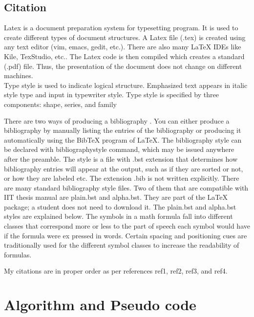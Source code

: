 \documentclass[titlepage]{article}
\begin{document}
\subsection{Citation}
Latex  \cite{ref1} is a document preparation system for typesetting program. It is used to create different types of document structures. A Latex file (.tex) is created using any text editor (vim, emacs, gedit, etc.). There are also many LaTeX IDEs like Kile, TexStudio, etc.. The Latex code is then compiled which creates a standard (.pdf) file. Thus, the presentation of the document does not change on different machines.\\
Type style \cite{ref2} is used to indicate logical structure. Emphasized text appears in italic style type and input in typewriter style. Type style is specified by three components: shape, series, and family\par
There are two ways of producing a bibliography \cite{ref3}. You can either produce a bibliography by manually listing the entries of the bibliography or producing it automatically using the BibTeX program of LaTeX. The bibliography style can be declared with bibliographystyle command, which may be issued anywhere after the preamble. The style is a file with .bst extension that determines how  bibliography entries will appear at the output, such as if they are sorted or not, or how they are labeled etc. The extension .bib is not written explicitly. There are many standard bibliography style files. Two of them that are compatible with IIT thesis manual are plain.bst and alpha.bst. They are part of the LaTeX package; a student does not need to download it. The plain.bst and alpha.bst styles are explained below. The symbols in a math formula fall into different classes that correspond more or less to the part of speech each symbol would have if the formula were ex pressed in words. Certain spacing and positioning cues are traditionally used for the different symbol classes to increase the readability of formulas. \cite{ref4}\par
My citations are in proper order as per references ref1, ref2, ref3, and ref4.

\newpage
\section{Algorithm and Pseudo code}
\end{document}
